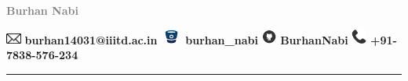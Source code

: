 \documentclass{article}
\author{}
\title{}
\date{}
\begin{document}
	\centering \fontsize{40}{50}\textbf{ \textcolor{Gray}{Burhan Nabi}}\\
	\vspace{30pt}

	\includegraphics[width=0.5cm  ]{buttons/mail.png}
	\hspace{2pt}
	\fontsize{10}{12}\textcolor{ProcessBlue}{ \textbf{burhan14031@iiitd.ac.in} }
	\hspace{25pt}
	\includegraphics[width=0.7cm  ]{buttons/bitbucket.png}
	\hspace{2pt}
	\fontsize{10}{12}\textcolor{ProcessBlue}{ \textbf{burhan\_nabi} }
	\hspace{25pt}
	\includegraphics[width=0.5cm  ]{buttons/github.png}
	\hspace{2pt}
	\fontsize{10}{12}\textcolor{ProcessBlue}{ \textbf{BurhanNabi} }
	\hspace{25pt}
	\includegraphics[width=0.5cm  ]{buttons/phone.png}
	\hspace{2pt}
	\fontsize{10}{12}\textcolor{ProcessBlue}{ \textbf{+91-7838-576-234} }
	
	
	
	\textcolor[RGB]{220,220,220}{\rule{\linewidth}{0.3pt}}						
	
	
	
\end{document}
